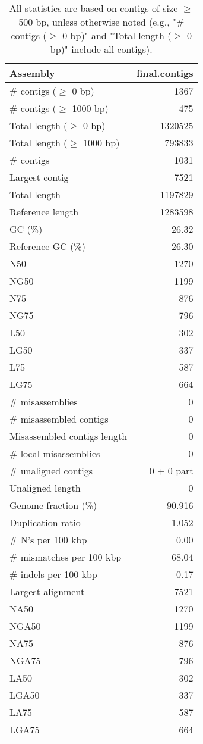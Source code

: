 \documentclass[12pt,a4paper]{article}
\begin{document}
\begin{table}[ht]
\begin{center}
\caption{All statistics are based on contigs of size $\geq$ 500 bp, unless otherwise noted (e.g., "\# contigs ($\geq$ 0 bp)" and "Total length ($\geq$ 0 bp)" include all contigs).}
\begin{tabular}{|l*{1}{|r}|}
\hline
Assembly & final.contigs \\ \hline
\# contigs ($\geq$ 0 bp) & 1367 \\ \hline
\# contigs ($\geq$ 1000 bp) & 475 \\ \hline
Total length ($\geq$ 0 bp) & 1320525 \\ \hline
Total length ($\geq$ 1000 bp) & 793833 \\ \hline
\# contigs & 1031 \\ \hline
Largest contig & 7521 \\ \hline
Total length & 1197829 \\ \hline
Reference length & 1283598 \\ \hline
GC (\%) & 26.32 \\ \hline
Reference GC (\%) & 26.30 \\ \hline
N50 & 1270 \\ \hline
NG50 & 1199 \\ \hline
N75 & 876 \\ \hline
NG75 & 796 \\ \hline
L50 & 302 \\ \hline
LG50 & 337 \\ \hline
L75 & 587 \\ \hline
LG75 & 664 \\ \hline
\# misassemblies & 0 \\ \hline
\# misassembled contigs & 0 \\ \hline
Misassembled contigs length & 0 \\ \hline
\# local misassemblies & 0 \\ \hline
\# unaligned contigs & 0 + 0 part \\ \hline
Unaligned length & 0 \\ \hline
Genome fraction (\%) & 90.916 \\ \hline
Duplication ratio & 1.052 \\ \hline
\# N's per 100 kbp & 0.00 \\ \hline
\# mismatches per 100 kbp & 68.04 \\ \hline
\# indels per 100 kbp & 0.17 \\ \hline
Largest alignment & 7521 \\ \hline
NA50 & 1270 \\ \hline
NGA50 & 1199 \\ \hline
NA75 & 876 \\ \hline
NGA75 & 796 \\ \hline
LA50 & 302 \\ \hline
LGA50 & 337 \\ \hline
LA75 & 587 \\ \hline
LGA75 & 664 \\ \hline
\end{tabular}
\end{center}
\end{table}
\end{document}
